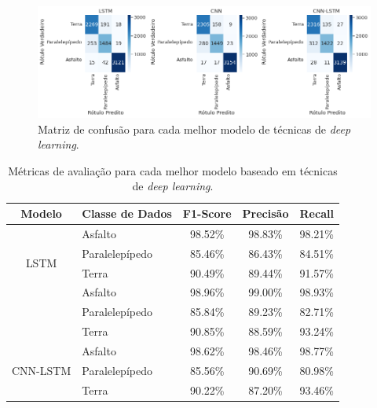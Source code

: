 \begin{figure}[H]
  \centering
  \caption{Matriz de confusão para cada melhor modelo de técnicas de \textit{deep learning}.}
  \label{fig:confusion_matrix_deep_tipo_superficie_1}
  \includegraphics[width=1\textwidth]{figuras/fig_35.png}
\end{figure}

\begin{table}[H]
\scriptsize
\centering
\caption{Métricas de avaliação para cada melhor modelo baseado em técnicas de \textit{deep learning}.} 
\label{table:deep_ml_metrics_tipo_superficie_1}
\begin{tabular}{clccc}
\toprule
\textbf{Modelo} & \multicolumn{1}{c}{\textbf{Classe de Dados}} & \textbf{F1-Score} & \textbf{Precisão} & \textbf{Recall} \\ \midrule
\multirow{4}{*}{LSTM} & Asfalto & 98.52\% & 98.83\% & 98.21\% \\ \cmidrule(l){2-5} 
 & Paralelepípedo & 85.46\% & 86.43\% & 84.51\% \\ \cmidrule(l){2-5} 
 & Terra & 90.49\% & 89.44\% & 91.57\% \\ \midrule
\multirow{4}{*}{CNN} & Asfalto & 98.96\% & 99.00\% & 98.93\% \\ \cmidrule(l){2-5} 
 & Paralelepípedo & 85.84\% & 89.23\% & 82.71\% \\ \cmidrule(l){2-5} 
 & Terra & 90.85\% & 88.59\% & 93.24\% \\ \midrule
\multirow{4}{*}{CNN-LSTM} & Asfalto & 98.62\% & 98.46\% & 98.77\% \\ \cmidrule(l){2-5} 
 & Paralelepípedo & 85.56\% & 90.69\% & 80.98\% \\ \cmidrule(l){2-5} 
 & Terra & 90.22\% & 87.20\% & 93.46\% \\ \bottomrule
\end{tabular}
\end{table}

